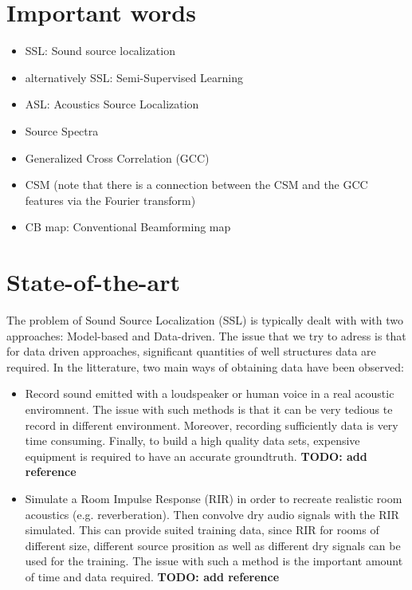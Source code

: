 \documentclass{article}
\begin{document}
\section{Important words}

\begin{itemize}
    \item SSL: Sound source localization
    \item alternatively SSL: Semi-Supervised Learning
    \item ASL: Acoustics Source Localization    
    \item Source Spectra
    \item Generalized Cross Correlation (GCC)
    \item CSM (note that there is a connection between the CSM and the GCC features via the Fourier transform)
    \item CB map: Conventional Beamforming map
\end{itemize}

\section{State-of-the-art}

The problem of Sound Source Localization (SSL) is typically dealt with with two approaches: Model-based and Data-driven. The issue that we try to adress is that for data driven approaches, significant quantities of well structures data are required. In the litterature, two main ways of obtaining data have been observed:

\begin{itemize}
    \item Record sound emitted with a loudspeaker or human voice in a real acoustic enviromnent. The issue with such methods is that it can be very tedious te record in different environment. Moreover, recording sufficiently data is very time consuming. Finally, to build a high quality data sets, expensive equipment is required to have an accurate groundtruth. \textbf{TODO: add reference}
    \item Simulate a Room Impulse Response (RIR) in order to recreate realistic room acoustics (e.g. reverberation). Then convolve dry audio signals with the RIR simulated. This can provide suited training data, since RIR for rooms of different size, different source prosition as well as different dry signals can be used for the training. The issue with such a method is the important amount of time and data required. \textbf{TODO: add reference}
\end{itemize}
\end{document}
